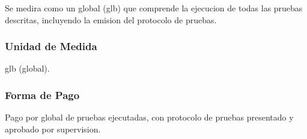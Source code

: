 Se medira como un global (glb) que comprende la ejecucion de todas las pruebas descritas, incluyendo la emision del protocolo de pruebas.

\subsubsection{Unidad de Medida}

glb (global).

\subsubsection{Forma de Pago}

Pago por global de pruebas ejecutadas, con protocolo de pruebas presentado y aprobado por supervision.
